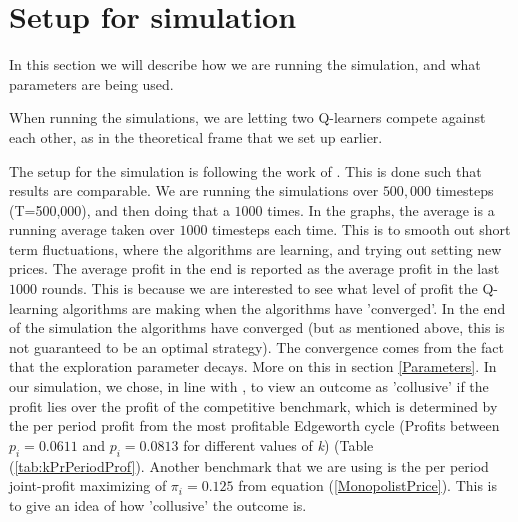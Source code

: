 \documentclass{article}
\begin{document}
\section{Setup for simulation}

In this section we will describe how we are running the simulation, and what parameters are being used. 

When running the simulations, we are letting two Q-learners compete against each other, as in the theoretical frame that we set up earlier.

The setup for the simulation is following the work of \cite{Klein2021}. This is done such that results are comparable.
We are running the simulations over $500,000$ timesteps (T=500,000), and then doing that a $1000$ times. In the graphs, the average is a running average taken over $1000$ timesteps each time. This is to smooth out short term fluctuations, where the algorithms are learning, and trying out setting new prices. The average profit in the end is reported as the average profit in the last $1000$ rounds. This is because we are interested to see what level of profit the Q-learning algorithms are making when the algorithms have 'converged'. In the end of the simulation the algorithms have converged (but as mentioned above, this is not guaranteed to be an optimal strategy). The convergence comes from the fact that the exploration parameter decays. More on this in section \ref{Parameters}. 
In our simulation, we chose, in line with \cite{Klein2021}, to view an outcome as 'collusive' if the profit lies over the profit of the competitive benchmark, which is determined by the per period profit from the most profitable Edgeworth cycle (Profits between $p_i = 0.0611$ and $p_i = 0.0813$ for different values of \textit{k}) (Table (\ref{tab:kPrPeriodProf}). Another benchmark that we are using is the per period joint-profit maximizing of $\pi_i =0.125$ from equation (\ref{MonopolistPrice}). This is to give an idea of how 'collusive' the outcome is.
\end{document}
